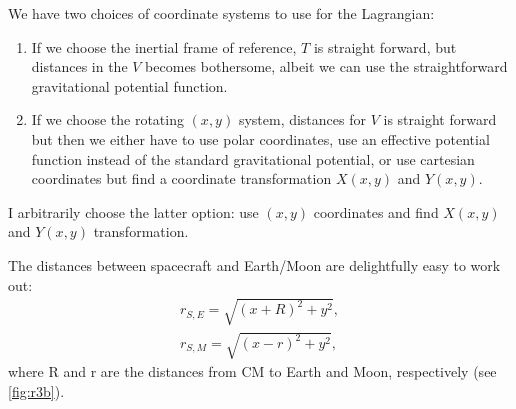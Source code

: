 We have two choices of coordinate systems to use for the Lagrangian:
\begin{enumerate}
    \item If we choose the inertial frame of reference, $T$ is straight forward, but distances in the $V$ becomes bothersome, albeit we can use the straightforward gravitational potential function.
    \item If we choose the rotating $(x,y)$ system, distances for $V$ is straight forward but then we either have to use polar coordinates, use an effective potential function instead of the standard gravitational potential, or use cartesian coordinates but find a coordinate transformation $X(x,y)$ and $Y(x,y)$.
\end{enumerate}
I arbitrarily choose the latter option: use $(x,y)$ coordinates and find $X(x,y)$ and $Y(x,y)$ transformation.

The distances between spacecraft and Earth/Moon are delightfully easy to work out:
\begin{align}
r_{S,E} = \sqrt{(x+R)^2+y^2}, \\
r_{S,M} = \sqrt{(x-r)^2+y^2},
\end{align}
where R and r are the distances from CM to Earth and Moon, respectively (see \ref{fig:r3b}).

